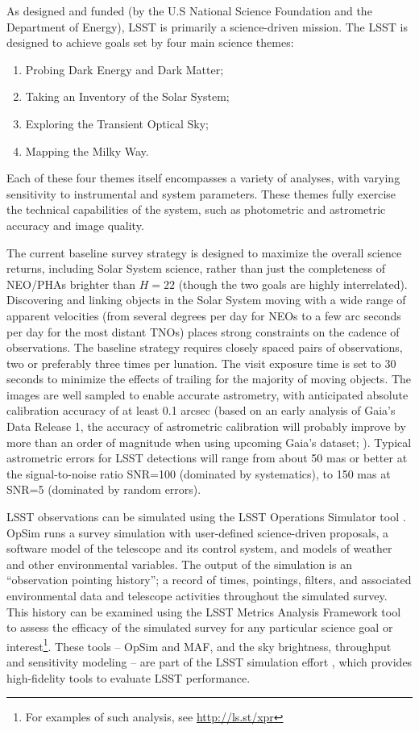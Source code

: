 As designed and funded (by the U.S National Science Foundation and
the Department of Energy), LSST is primarily a science-driven mission.
The LSST is designed to achieve goals set by four main science themes:
\begin{enumerate}
\item Probing Dark Energy and Dark Matter;
\item Taking an Inventory of the Solar System;
\item Exploring the Transient Optical Sky;
\item Mapping the Milky Way.
\end{enumerate}
Each of these four themes itself encompasses a variety of analyses, with
varying sensitivity to instrumental and system parameters. These themes
fully exercise the technical capabilities of the system, such as photometric
and astrometric accuracy and image quality.

The current baseline survey strategy is designed to maximize the overall science returns, including
Solar System science, rather than just the completeness of NEO/PHAs brighter than $H=22$ (though the
two goals are highly interrelated). Discovering and linking objects in the Solar System
moving with a wide range of apparent velocities (from several degrees per day for
NEOs to a few arc seconds per day for the most distant TNOs) places strong
constraints on the cadence of observations. The baseline strategy requires closely
spaced pairs of observations, two or preferably three times per lunation. The visit
exposure time is set to 30 seconds to minimize the effects of trailing for the majority of
moving objects. The images are well sampled to enable accurate astrometry, with
anticipated absolute calibration accuracy of at least 0.1 arcsec (based on an early analysis 
of Gaia's Data Release 1, the accuracy of astrometric calibration will probably improve 
by more than an order of magnitude when using upcoming Gaia's dataset; \citealt{Gaia}).
Typical astrometric errors for LSST detections will range from about 50 mas or better
at the signal-to-noise ratio SNR=100 (dominated by systematics), to 150 mas at SNR=5
(dominated by random errors). 

LSST observations can be simulated using the LSST Operations Simulator tool
\citep[OpSim,][]{delgado14}. OpSim runs a survey simulation with user-defined
science-driven proposals, a software model of the telescope and its control
system, and models of weather and other environmental variables. The output of
the simulation is an ``observation pointing history''; a record of times,
pointings, filters, and associated environmental data and telescope
activities throughout the simulated survey.  This history can be examined using
the LSST Metrics Analysis Framework tool \citep[MAF,][]{jones14} to assess the
efficacy of the simulated survey for any particular science goal or
interest\footnote{For examples of such analysis, see \url{http://ls.st/xpr}}. These
tools -- OpSim and MAF, and the sky brightness, throughput and sensitivity modeling --
are part of the LSST simulation effort \citep{LSSTSimsOverview}, which provides high-fidelity
tools to evaluate LSST performance.


